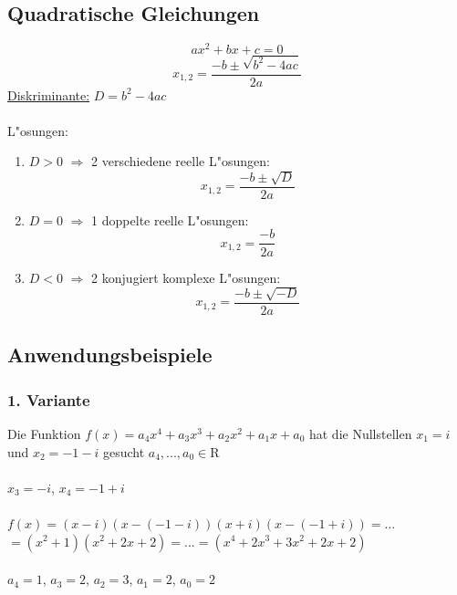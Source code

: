 \documentclass[10pt,a4paper,landscape]{article}
\begin{document}
\begin{multicols*}{3}
		\subsection{Quadratische Gleichungen}
		\[ ax^2 +bx + c = 0 \]
		\[ x_{1,2} = \frac{-b \pm \sqrt{b^2 -4ac}}{2a} \]
		\uline{Diskriminante:} $D = b^2 -4ac$\\
		\\
		L"osungen:
		\begin{enumerate}
			\item $D > 0$ $\Rightarrow$ 2 verschiedene reelle L"osungen: \\
			\[ x_{1,2} = \frac{-b \pm \sqrt{D}}{2a} \]
			\item $D = 0$ $\Rightarrow$ 1 doppelte reelle L"osungen:
			\[ x_{1,2} = \frac{-b}{2a} \]
			\item $D < 0$ $\Rightarrow$ 2 konjugiert komplexe L"osungen:
			\[ x_{1,2} = \frac{-b \pm \sqrt{-D}}{2a} \]
		\end{enumerate}
		
		\subsection{Anwendungsbeispiele}
		\subsubsection{1. Variante}
		Die Funktion $f(x) = a_4x^4 +  a_3x^3 +  a_2x^2 +  a_1x +  a_0$ hat die Nullstellen $x_1 = i$ und $x_2 = -1 - i$ gesucht $a_4, ... , a_0 \in \mathrm{R}$\\
		\\
		$x_3 = -i$, $x_4 = -1 + i$ \\
		\\
		$f(x) = (x-i)(x-(-1-i))(x+i)(x-(-1+i)) = ...$\\
		$= (x^2 +1)(x^2 +2x + 2) = ... = (x^4 + 2x^3 + 3x^2 + 2x + 2)$\\
		\\
		$a_4 = 1$, $a_3 = 2$, $a_2 = 3$, $a_1 = 2$, $a_0 = 2$ 

\end{multicols*}
\end{document}
